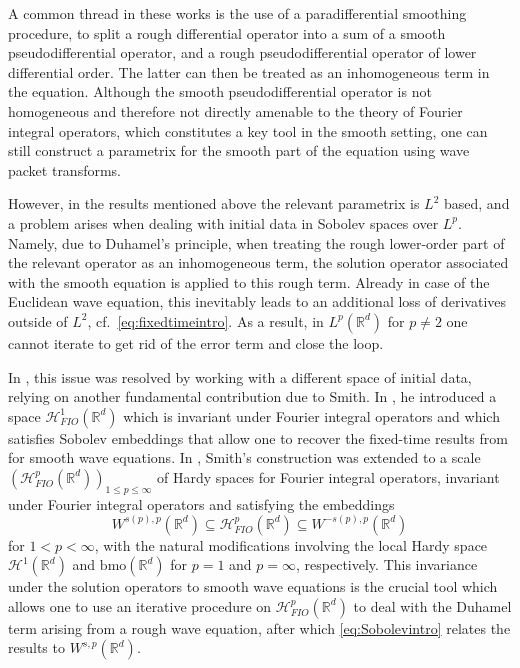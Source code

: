 \documentclass{amsart}
\numberwithin{equation}{section}
\theoremstyle{definition}
\newcommand{\R}{\mathbb{R}}
\newcommand{\Rd}{\mathbb{R}^{d}}
\newcommand {\bmo}{\mathrm{bmo}}
\newcommand {\HT}{\mathcal{H}}
\newcommand {\Hp}{\mathcal{H}^{p}_{FIO}(\R^d)}
\begin{document}
A common thread in these works is the use of a paradifferential smoothing procedure, to split a rough differential operator into a sum of a smooth pseudodifferential operator, and a rough pseudodifferential operator of lower differential order. The latter can then be treated as an inhomogeneous term in the equation. Although the smooth pseudodifferential operator is not homogeneous and therefore not directly amenable to the theory of Fourier integral operators, which constitutes a key tool in the smooth setting, one can still construct a parametrix for the smooth part of the equation using wave packet transforms.

However, in the results mentioned above the relevant parametrix is $L^{2}$ based, and a problem arises when dealing with initial data in Sobolev spaces over $L^{p}$. Namely, due to Duhamel's principle, when treating the rough lower-order part of the relevant operator as an inhomogeneous term, the solution operator associated with the smooth equation is applied to this rough term. Already in case of the Euclidean wave equation, this inevitably leads to an additional loss of derivatives outside of $L^{2}$, cf.~\eqref{eq:fixedtimeintro}. As a result, in $L^{p}(\Rd)$ for $p\neq 2$ one cannot iterate to get rid of the error term and close the loop.

In \cite{HassellRozendaal2023,LiRoSo25a}, this issue was resolved by working with a different space of initial data, relying on another fundamental contribution due to Smith. In \cite{Smith98a}, he introduced a space $\HT^{1}_{FIO}(\Rd)$ which is invariant under Fourier integral operators and which satisfies Sobolev embeddings that allow one to recover the fixed-time results from \cite{SeSoSt91} for smooth wave equations. In \cite{HassellPortalRozendaal2020}, Smith's construction was extended to a scale $(\Hp)_{1\leq p\leq \infty}$ of Hardy spaces for Fourier integral operators, invariant under Fourier integral operators and satisfying the embeddings
\begin{equation}\label{eq:Sobolevintro}
W^{s(p),p}(\Rd)\subseteq \Hp\subseteq W^{-s(p),p}(\Rd)
\end{equation}
for $1<p<\infty$, with the natural modifications involving the local Hardy space $\HT^{1}(\Rd)$ and $\bmo(\Rd)$ for $p=1$ and $p=\infty$, respectively. 
This invariance under the solution operators to smooth wave equations is the crucial tool which allows one to use an iterative procedure on $\Hp$ to deal with the Duhamel term arising from a rough wave equation, after which \eqref{eq:Sobolevintro} relates the results to $W^{s,p}(\Rd)$.
\end{document}
